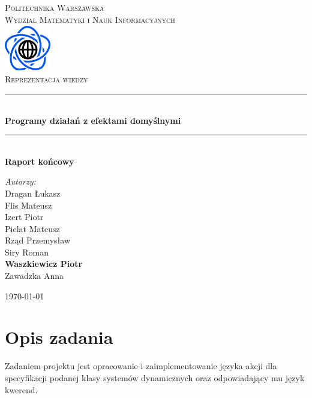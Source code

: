 \documentclass{article}
\begin{document}
\begin{titlepage}
\newcommand{\HRule}{\rule{\linewidth}{0.5mm}}
\newcommand{\Action}[1]{\textsc{#1}}
\center
\textsc{\LARGE Politechnika Warszawska}\\[0.3cm]
\textsc{\Large Wydział Matematyki i Nauk Informacyjnych}\\[0.6cm]
\includegraphics[width=2cm, height=2cm]{logo}\\[0.6cm]
\textsc{\Huge Reprezentacja wiedzy}\\[0.3cm]
\HRule \\[0.4cm]
{ \LARGE \bfseries Programy działań z efektami domyślnymi}\\[0.1cm]
 
\HRule \\[0.4cm]
{  \bfseries Raport końcowy}\\[1.2cm]
\begin{flushright}
\Large \emph{Autorzy:}\\[0.5cm]
Dragan Łukasz\\
Flis Mateusz\\
Izert Piotr\\
Pielat Mateusz\\
Rząd Przemysław\\
Siry Roman\\
\textbf{Waszkiewicz Piotr}\\
Zawadzka Anna\\[0.9cm]
\end{flushright}
\vfill
{\large \today}\\[1cm]
\end{titlepage}
\newpage

\section{Opis zadania}

Zadaniem projektu jest opracowanie i zaimplementowanie języka akcji dla specyfikacji podanej klasy systemów dynamicznych oraz odpowiadający mu język kwerend.\\
\end{document}
